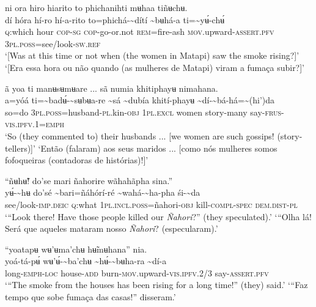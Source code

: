 \documentclass[output=paper,
modfonts,nonflat
]{langsci/langscibook}
\begin{document}
 
\largerpage[2]
\ea ni ora hiro hiarito to phichanihti mʉhaa tiñʉchʉ. \\[.3em]
\gll {\textasciitilde}dí	hóra	hí-ro	hí-a-rito	to=phichá-{\textasciitilde}dítí	{\textasciitilde}bʉhá-a	ti={\textasciitilde}yʉ́-chʉ́ \\
     \textsc{q:}which	hour	\textsc{cop-sg}	\textsc{cop-}go-or.not	\textsc{rem}=fire-ash	\textsc{mov.}upward-\textsc{assert.pfv}	3\textsc{pl.poss}=see/look-\textsc{sw.ref} \\
\glt ‘[Was at this time or not when (the women in Matapi) saw the smoke rising?]’
\newpage
\glt ‘[Era essa hora ou não quando (as mulheres de Matapi) viram a fumaça subir?]’
\z 

\ea ã yoa ti manʉsʉmʉare ... sã numia khitiphayʉ nimahana. \\[.3em]
\gll {\textasciitilde}a=yóá	ti={\textasciitilde}badʉ́-{\textasciitilde}sʉbʉa-re	{\textasciitilde}sá	{\textasciitilde}dubía	khití-phayʉ	{\textasciitilde}dí-{\textasciitilde}bá-há={\textasciitilde}(hi')da \\
     so=do	3\textsc{pl.poss}=husband-\textsc{pl}.kin-\textsc{obj}	1\textsc{pl.excl}	women	story-many	say-\textsc{frus-vis.ipfv.1=emph} \\
\glt ‘So (they commented to) their husbands ... [we women are such gossips! (story-tellers)]’
\glt ‘Então (falaram) aos seus maridos ... [como nós mulheres somos fofoqueiras (contadoras de histórias)!]’
\z

\ea “ñʉhʉ̃! do'se mari ñahorire wãhahãpha sina.” \\[.3em]
\gll {\textasciitilde}yʉ́-{\textasciitilde}hʉ{\footnotemark}	do'sé	{\textasciitilde}bari=ñáhórí-ré	{\textasciitilde}wahá-{\textasciitilde}ha-pha	śi-{\textasciitilde}da \\
     see/look-\textsc{imp.deic}	\textsc{q:}what	1\textsc{pl.incl.poss}=ñahori\textsc{-obj}	kill-\textsc{compl-spec}	\textsc{dem.dist-pl} \\
\glt ‘“Look there! Have those people killed our \textit{Ñahori}?” (they speculated).’
\glt ‘“Olha lá! Será que aqueles mataram nosso \textit{Ñahori}? (especularam).’
\z 

\ea “yoatapʉ wʉ'ʉma'chʉ hʉ̃mʉhana” nia. \\[.3em]
\gll yoá-tá-pʉ́	wʉ'ʉ́-{\textasciitilde}ba'chʉ	{\textasciitilde}hʉ́-{\textasciitilde}bʉha-ra	{\textasciitilde}dí-a  \\
     long\textsc{-emph-loc}	house-\textsc{add}	burn-\textsc{mov.}upward-\textsc{vis.ipfv.}2/3	say-\textsc{assert.pfv} \\
\glt ‘“The smoke from the houses has been rising for a long time!” (they) said.’
\glt ‘“Faz tempo que sobe fumaça das casas!” disseram.’
\z 
\end{document}
